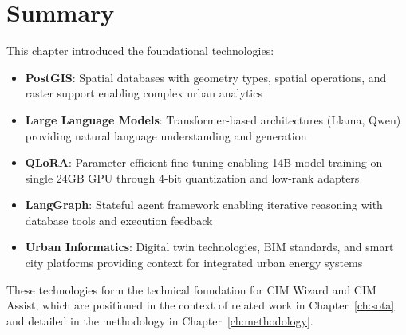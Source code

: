 \section{Summary}

This chapter introduced the foundational technologies:

\begin{itemize}[leftmargin=1.2em]
  \item \textbf{PostGIS}: Spatial databases with geometry types, spatial operations, and raster support enabling complex urban analytics
  \item \textbf{Large Language Models}: Transformer-based architectures (Llama, Qwen) providing natural language understanding and generation
  \item \textbf{QLoRA}: Parameter-efficient fine-tuning enabling 14B model training on single 24GB GPU through 4-bit quantization and low-rank adapters
  \item \textbf{LangGraph}: Stateful agent framework enabling iterative reasoning with database tools and execution feedback
  \item \textbf{Urban Informatics}: Digital twin technologies, BIM standards, and smart city platforms providing context for integrated urban energy systems
\end{itemize}

These technologies form the technical foundation for CIM Wizard and CIM Assist, which are positioned in the context of related work in Chapter~\ref{ch:sota} and detailed in the methodology in Chapter~\ref{ch:methodology}.

